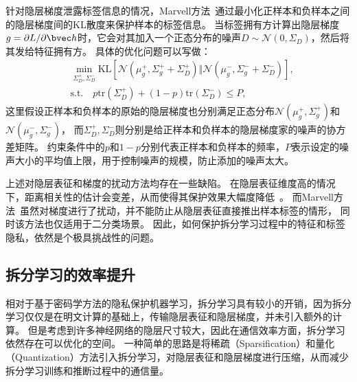 针对隐层梯度泄露标签信息的情况，Marvell方法~\cite{oscarli2022label_defense_marvell}通过最小化正样本和负样本之间的隐层梯度间的KL散度来保护样本的标签信息。
%
当标签拥有方计算出隐层梯度$g = \partial L/\partial \bvec h$时，它会对其加入一个正态分布的噪声$D \sim \mathcal N(0, \Sigma_D)$，然后将其发给特征拥有方。
%
具体的优化问题可以写做：
\begin{equation}
\begin{split}
\label{eq:related_work:marvell}
    & \min_{\Sigma_D^+,\Sigma_D^-} \text{KL}\left[\mathcal N(\mu_g^+, \Sigma_g^+ + \Sigma_D^+)\Vert\mathcal N(\mu_g^-, \Sigma_g^- + \Sigma_D^-)\right],
    \\
    & \text{s.t.}\quad p\text{tr}(\Sigma_D^+) + (1-p)\text{tr}(\Sigma_D^-) \le P,
\end{split}
\end{equation}
这里假设正样本和负样本的原始的隐层梯度也分别满足正态分布$\mathcal N(\mu_g^+, \Sigma_g^+)$和$\mathcal N(\mu_g^-, \Sigma_g^-)$，
而$\Sigma_D^+,\Sigma_D^-$则分别是给正样本和负样本的隐层梯度家的噪声的协方差矩阵。
%
约束条件中的$p$和$1-p$分别代表正样本和负样本的频率，$P$表示设定的噪声大小的平均值上限，用于控制噪声的规模，防止添加的噪声太大。
%


上述对隐层表征和梯度的扰动方法均存在一些缺陷。
%
在隐层表征维度高的情况下，距离相关性的估计会变差，从而使得其保护效果大幅度降低~\cite{erdogan2022unsplit}。
%
而Marvell方法~\cite{sunjiankai2022forward_embedding_protect}虽然对梯度进行了扰动，并不能防止从隐层表征直接推出样本标签的情形，
同时该方法也仅适用于二分类场景。
%
因此，如何保护拆分学习过程中的特征和标签隐私，依然是个极具挑战性的问题。


\subsection{拆分学习的效率提升}
相对于基于密码学方法的隐私保护机器学习，拆分学习具有较小的开销，因为拆分学习仅仅是在明文计算的基础上，传输隐层表征和隐层梯度，并未引入额外的计算。
%
但是考虑到许多神经网络的隐层尺寸较大，因此在通信效率方面，拆分学习依然存在可以优化的空间。
%
一种简单的思路是将稀疏（Sparsification）和量化（Quantization）方法引入拆分学习，对隐层表征和隐层梯度进行压缩，从而减少拆分学习训练和推断过程中的通信量。
%

